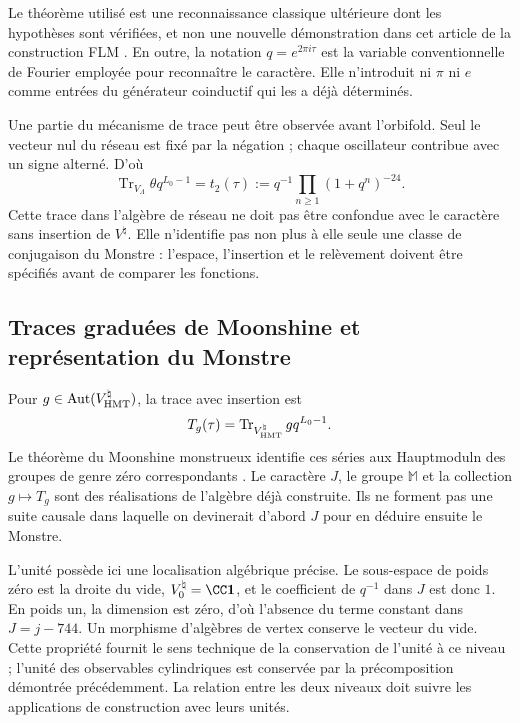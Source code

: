 Le théorème utilisé est une reconnaissance classique ultérieure dont les hypothèses sont vérifiées, et non une nouvelle démonstration dans cet article de la construction FLM \cite{flm}. En outre, la notation $q=e^{2\pi i\tau}$ est la variable conventionnelle de Fourier employée pour reconnaître le caractère. Elle n'introduit ni $\pi$ ni $e$ comme entrées du générateur coinductif qui les a déjà déterminés.

Une partie du mécanisme de trace peut être observée avant l'orbifold.
Seul le vecteur nul du réseau est fixé par la négation ; chaque
oscillateur contribue avec un signe alterné. D'où
\[
 \operatorname{Tr}_{V_\Lambda}\theta q^{L_0-1}
   =t_2(\tau)
   :=q^{-1}\prod_{n\geq1}(1+q^n)^{-24}.
\]
Cette trace dans l'algèbre de réseau ne doit pas être confondue avec le
caractère sans insertion de $V^\natural$. Elle n'identifie pas non plus à elle
seule une classe de conjugaison du Monstre : l'espace, l'insertion
et le relèvement doivent être spécifiés avant de comparer les fonctions.

\subsection{Traces graduées de Moonshine et représentation du Monstre}
\label{exc:alcance}

Pour $g\in\operatorname{Aut}(V^\natural_{\rm HMT})$, la trace avec insertion est
\[
 T_g(\tau)=
 \operatorname{Tr}_{V^\natural_{\rm HMT}}gq^{L_0-1}.
\]
Le théorème du Moonshine monstrueux identifie ces séries aux
Hauptmoduln des groupes de genre zéro correspondants
\cite[théorème~1.1]{borcherds}.
Le caractère $J$, le groupe $\mathbb M$ et la collection $g\mapsto T_g$
sont des réalisations de l'algèbre déjà construite. Ils ne forment pas une suite
causale dans laquelle on devinerait d'abord $J$ pour en déduire ensuite le Monstre.

L'unité possède ici une localisation algébrique précise. Le sous-espace de poids zéro est la droite du vide, \(V^\natural_0=\CC\mathbf1\), et le coefficient de \(q^{-1}\) dans \(J\) est donc \(1\). En poids un, la dimension est zéro, d'où l'absence du terme constant dans \(J=j-744\). Un morphisme d'algèbres de vertex conserve le vecteur du vide. Cette propriété fournit le sens technique de la conservation de l'unité à ce niveau ; l'unité des observables cylindriques est conservée par la précomposition démontrée précédemment. La relation entre les deux niveaux doit suivre les applications de construction avec leurs unités.

